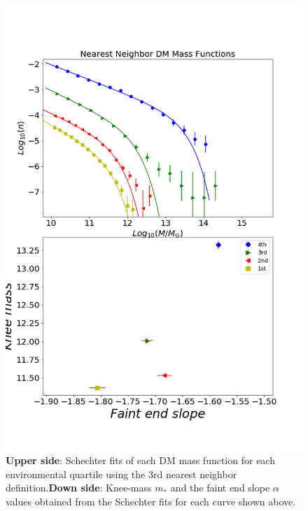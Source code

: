 \documentclass[a4paper,fleqn,usenatbib]{mnras}
\begin{document}
\begin{figure}
	\includegraphics[width=\columnwidth]{./pics/quartilesDM.png}
    \caption{\textbf{Upper side}: Schechter fits of each DM mass function for each environmental quartile using the 3rd nearest neighbor definition.\textbf{Down side}: Knee-mass $m_\ast$ and the faint end slope $\alpha$ values obtained from the Schechter fits for each curve shown above.}
    \label{fig:quartilesDM}
\end{figure}
\end{document}
